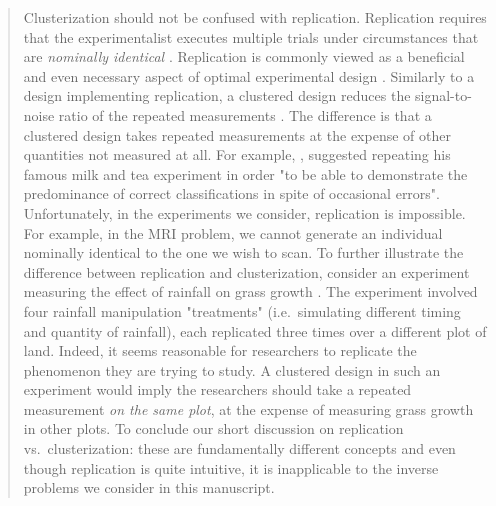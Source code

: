 \begin{quote} %
  Clusterization should not be confused with replication. Replication
requires that the experimentalist executes multiple trials under
circumstances that are \emph{nominally identical} \cite[Section
  1.2.4]{morris2011}. Replication is commonly viewed as a beneficial
and even necessary aspect of optimal experimental design
\cite{fisher1949design, morris2011, schafer2001replication}. Similarly
to a design implementing replication, a clustered design reduces the
signal-to-noise ratio of the repeated measurements
\cite{telford2007brief}. The difference is that a clustered design
takes repeated measurements at the expense of other quantities not
measured at all.
\newline %
For example, \cite{fisher1949design}, suggested repeating his famous
milk and tea experiment in order "to be able to demonstrate the
predominance of correct classifications in spite of occasional
errors". Unfortunately, in the experiments we consider, replication is
impossible. For example, in the MRI problem, we cannot generate an
individual nominally identical to the one we wish to scan.
\newline %
To further illustrate the difference between replication and
clusterization, consider an experiment measuring the effect of
rainfall on grass growth \cite{fay2000rainfall}. The experiment
involved four rainfall manipulation "treatments" (i.e.~simulating
different timing and quantity of rainfall), each replicated three
times over a different plot of land. Indeed, it seems reasonable for
researchers to replicate the phenomenon they are trying to study. A
clustered design in such an experiment would imply the researchers
should take a repeated measurement \emph{on the same plot}, at the
expense of measuring grass growth in other plots. To conclude our
short discussion on replication vs.~clusterization: these are
fundamentally different concepts and even though replication is quite
intuitive, it is inapplicable to the inverse problems we consider in
this manuscript.
\end{quote}


